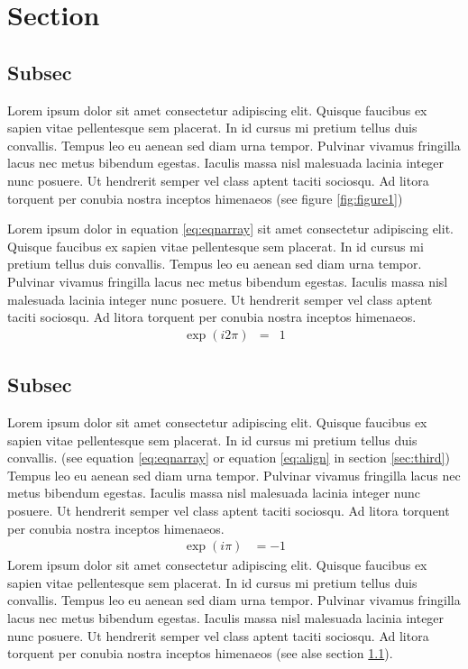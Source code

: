 \section{Section}
\subsection{Subsec}\label{sec:first}
Lorem ipsum dolor sit amet consectetur adipiscing elit. Quisque
faucibus ex sapien vitae pellentesque sem placerat. In id cursus mi
pretium tellus duis convallis. Tempus leo eu aenean sed diam urna
tempor. Pulvinar vivamus fringilla lacus nec metus bibendum egestas.
Iaculis massa nisl malesuada lacinia integer nunc posuere. Ut
hendrerit semper vel class aptent taciti sociosqu. Ad litora torquent
per conubia nostra inceptos himenaeos (see figure \ref{fig:figure1})

Lorem ipsum dolor in equation \eqref{eq:eqnarray} sit amet consectetur
adipiscing elit. Quisque faucibus ex sapien vitae pellentesque sem
placerat. In id cursus mi pretium tellus duis convallis. Tempus leo eu
aenean sed diam urna tempor. Pulvinar vivamus fringilla lacus nec
metus bibendum egestas. Iaculis massa nisl malesuada lacinia integer
nunc posuere. Ut hendrerit semper vel class aptent taciti sociosqu. Ad
litora torquent per conubia nostra inceptos himenaeos.
\begin{eqnarray}
  \label{eq:eqnarray}
  \exp(i2\pi)&=&1
\end{eqnarray}

\subsection{Subsec}\label{sec:second}
Lorem ipsum dolor sit amet consectetur adipiscing elit. Quisque
faucibus ex sapien vitae pellentesque sem placerat. In id cursus mi
pretium tellus duis convallis. (see equation \eqref{eq:eqnarray} or
equation \ref{eq:align} in section \ref{sec:third}) Tempus leo eu
aenean sed diam urna tempor. Pulvinar vivamus fringilla lacus nec
metus bibendum egestas. Iaculis massa nisl malesuada lacinia integer
nunc posuere. Ut hendrerit semper vel class aptent taciti sociosqu. Ad
litora torquent per conubia nostra inceptos himenaeos.
\begin{align}
  \label{eq:align}
  \exp(i\pi)&=-1
\end{align}
Lorem ipsum dolor sit amet consectetur adipiscing elit. Quisque
faucibus ex sapien vitae pellentesque sem placerat. In id cursus mi
pretium tellus duis convallis. Tempus leo eu aenean sed diam urna
tempor. Pulvinar vivamus fringilla lacus nec metus bibendum egestas.
Iaculis massa nisl malesuada lacinia integer nunc posuere. Ut
hendrerit semper vel class aptent taciti sociosqu. Ad litora torquent
per conubia nostra inceptos himenaeos (see alse section \ref{sec:first}).

